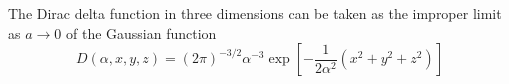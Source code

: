 The Dirac delta function in three dimensions can be taken as the
improper limit as $a \rightarrow 0$ of the Gaussian function
\[
D(\alpha, x, y, z) =
(2\pi)^{-3/2}\alpha^{-3}\exp{\left[ -\frac{1}{2\alpha^2}(x^2 + y^2 + z^2) \right]}
\]
